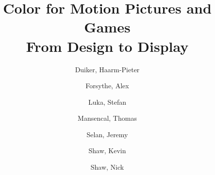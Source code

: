 \title{
    {\LARGE Color for Motion Pictures and Games}\\
    \vspace{5mm}
    {\large From Design to Display}
}

\author{
    Duiker, Haarm-Pieter\\
    \and
    Forsythe, Alex\\
    \and
    Luka, Stefan\\
    \and
    Mansencal, Thomas\\
    \and
    Selan, Jeremy\\
    \and
    Shaw, Kevin\\
    \and
    Shaw, Nick\\
}

\date{}
